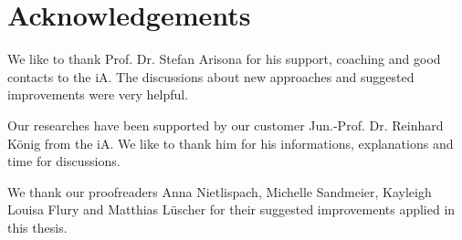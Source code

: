 \section{Acknowledgements}

We like to thank Prof. Dr. Stefan Arisona for his support, coaching and good contacts to the \acrfull{iA}. The discussions about new approaches and suggested improvements were very helpful.

Our researches have been supported by our customer Jun.-Prof. Dr. Reinhard König from the \gls{iA}. We like to thank him for his informations, explanations and time for discussions.

We thank our proofreaders Anna Nietlispach, Michelle Sandmeier, Kayleigh Louisa Flury and Matthias Lüscher for their suggested improvements applied in this thesis.